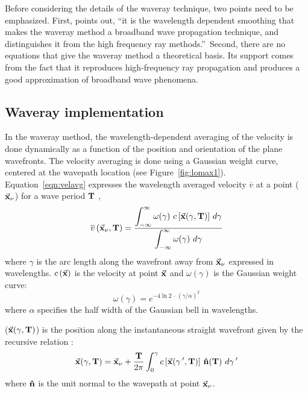 Before considering the details of the waveray technique, two points
need to be emphasized.  First, \cite{Lomax} points out, ``it is the
wavelength dependent smoothing that makes the waveray method a
broadband wave propagation technique, and distinguishes it from the
high frequency ray methods.''\ Second, there are no equations that
give the waveray method a theoretical basis.  Its support comes from
the fact that it reproduces high-frequency ray propagation and
produces a good approximation of broadband wave phenomena.



\subsection{Waveray implementation}

In the waveray method, the wavelength-dependent
averaging of the velocity is done dynamically as a function
of the position and orientation of the plane wavefronts.
The velocity
averaging is done using a Gaussian weight curve, centered at the wavepath
location (see Figure~\ref{fig:lomax1}). Equation~\ref{eqn:velavg} expresses the
wavelength averaged velocity $\overline{v}$ at a point 
($ \vec{\bf x}_{\nu} $) for a wave period $\bf T$ \cite[]{Lomax},
%
\begin{equation}
 \overline{v}\, (\vec{\bf x}_{\nu},{\bf T\/}) = \frac{
  \displaystyle \int_{-\infty}^{\infty}
  \omega(\gamma)\
  c\, [\vec{\bf x}(\gamma, {\bf T\/})]\
  d\gamma}
  {\displaystyle \int_{-\infty}^{\infty}
  \omega(\gamma)\ d\gamma}
\label{eqn:velavg}
\end{equation}
%
where $\gamma$ is the arc length along the wavefront away from 
$\vec{\bf x}_{\nu}$ expressed in wavelengths.
$c\, (\vec{\bf x})$ is the velocity at point $\vec{\bf x}$
and $\omega(\gamma)$ is the Gaussian weight curve:
%
\begin{equation}
 \omega(\gamma) = e^{-4 \ln 2\, \cdot\, (\gamma/\alpha)^{2}}
\label{eqn:gauss}
\end{equation}
%
where $\alpha$ specifies the half width of the Gaussian bell in
wavelengths.

($\vec{\bf x}(\gamma,{\bf T\/})$) is the position along the 
instantaneous straight wavefront given by the recursive relation
\cite[]{Lomax}:
%
\begin{equation}
 \vec{\bf x}(\gamma, {\bf T\/}) = \vec{\bf x}_{\nu} + \frac{{\bf T\/}}{2 \pi}
 \int_{0}^{\gamma} c\, [\vec{\bf x}(\gamma\, ', {\bf T\/})]\
 {\bf \hat{n}}({\bf T\/})\
 d\gamma\, '
\label{eqn:post}
\end{equation}
%
where ${\bf \hat{n}}$ is the unit normal to the wavepath at
point $\vec{\bf x}_{\nu}$.

